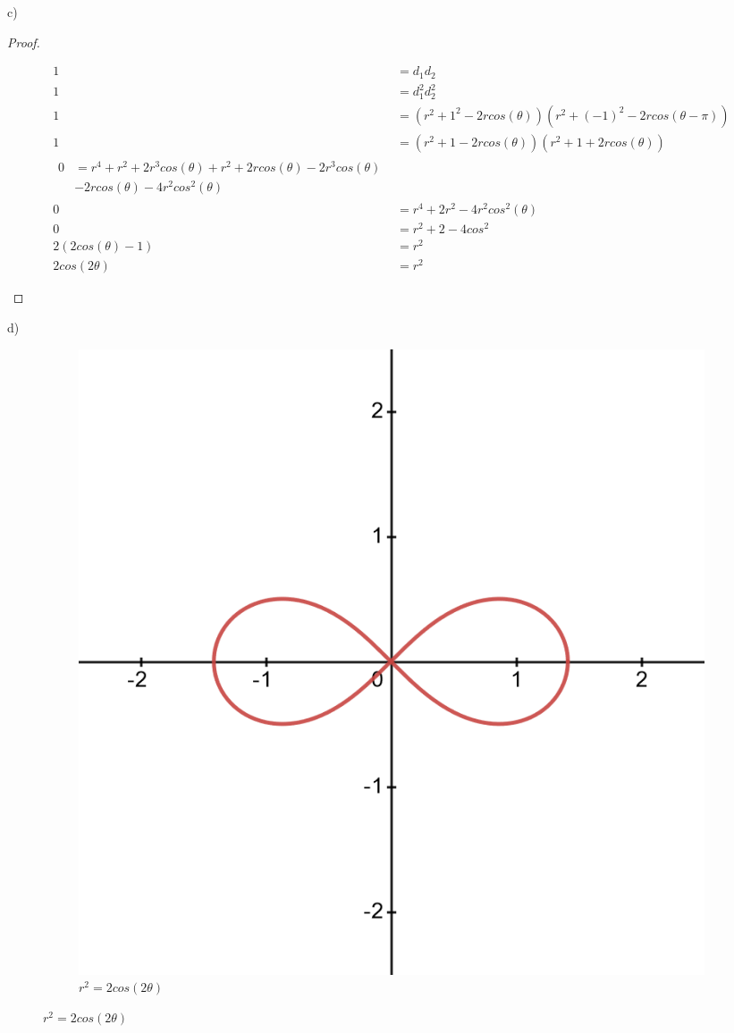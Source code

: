 \documentclass[11pt]{article}
\newcommand{\bproof}{\begin{proof}
$ $ \\
\begin{adjustwidth}{3em}{0pt}
}
\newcommand{\eproof}{\end{adjustwidth}
\end{proof}}
\begin{document}
\begin{flushleft}
\newpage

c) \bigskip

\bproof
	\begin{align*}
	1 &= d_1d_2 \\
	1 &= d_1^2d_2^2 \\
	1 &= (r^2 + 1^2 -2rcos(\theta))(r^2 + (-1)^2 -2rcos(\theta - \pi)) \\
	1 &= (r^2 + 1 -2rcos(\theta))(r^2 + 1 +2rcos(\theta)) \\
	\begin{split} 0 &=
	r^4 + r^2 + 2r^3cos(\theta) + r^2 + 2rcos(\theta) - 2r^3cos(\theta)\\ & - 2rcos(\theta) - 4r^2cos^2(\theta) \end{split} \\
	0 &= r^4 + 2r^2 - 4r^2cos^2(\theta) \\
	0 &= r^2 + 2 - 4cos^2 \\
	2(2cos(\theta) -1) &= r^2 \\
	2cos(2\theta) &= r^2
	\end{align*}			
\eproof

d) \bigskip
\begin{figure}[h]
\centering
	\begin{subfigure}[b]{0.3\textwidth}
	\includegraphics[width=\textwidth]{r=sqrt2cos2theta.png}
	\caption{$r^2=2cos(2\theta)$}
	\end{subfigure}
\end{figure}


\end{flushleft}
\end{document}

